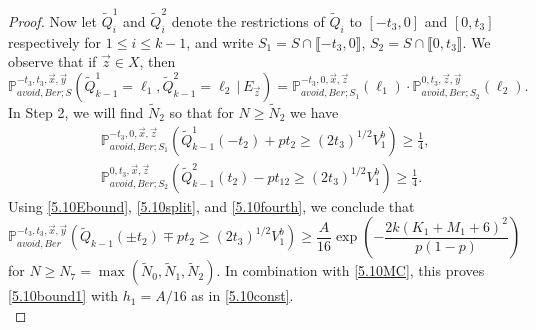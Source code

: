 \begin{proof}
	Now let $\tilde{Q}_i^1$ and $\tilde{Q}_i^2$ denote the restrictions of $\tilde{Q}_i$ to $[-t_3,0]$ and $[0,t_3]$ respectively for $1\leq i\leq k-1$, and write $S_1 = S\cap\llbracket -t_3,0\rrbracket$, $S_2 = S\cap\llbracket 0, t_3\rrbracket$. We observe that if $\vec{z}\in X$, then
	\begin{equation}\label{5.10split}
	\mathbb{P}^{-t_3,t_3,\vec{x},\vec{y}}_{avoid,Ber;S}\left(\tilde{Q}^1_{k-1} = \ell_1, \tilde{Q}^2_{k-1} = \ell_2 \, |\, E_{\vec{z}}\right) = \mathbb{P}^{-t_3,0,\vec{x},\vec{z}}_{avoid,Ber;S_1}(\ell_1)\cdot\mathbb{P}^{0,t_3,\vec{z},\vec{y}}_{avoid,Ber;S_2}(\ell_2).
	\end{equation}
	In Step 2, we will find $\tilde{N}_2$ so that for $N\geq\tilde{N}_2$ we have
	\begin{equation}\label{5.10fourth}
	\begin{split}
	&\mathbb{P}^{-t_3,0,\vec{x},\vec{z}}_{avoid,Ber;S_1}\left(\tilde{Q}^1_{k-1}(-t_2) + pt_2 \geq (2t_3)^{1/2}V_1^b\right) \geq \frac{1}{4},\\
	&\mathbb{P}^{0,t_3,\vec{x},\vec{z}}_{avoid,Ber;S_2}\left(\tilde{Q}^2_{k-1}(t_2) - pt_{12} \geq (2t_3)^{1/2}V_1^b\right) \geq \frac{1}{4}.
	\end{split}
	\end{equation}
	Using \eqref{5.10Ebound}, \eqref{5.10split}, and \eqref{5.10fourth}, we conclude that
	\[
	\mathbb{P}^{-t_3,t_3,\vec{x},\vec{y}}_{avoid, Ber}\left(\tilde{Q}_{k-1}(\pm t_2) \mp pt_2 \geq (2t_3)^{1/2}V_1^b\right) \geq \frac{A}{16}\exp\left(-\frac{2k(K_1+M_1+6)^2}{p(1-p)}\right)
	\]
	for $N\geq N_7 = \max(\tilde{N}_0,\tilde{N}_1,\tilde{N}_2)$. In combination with \eqref{5.10MC}, this proves \eqref{5.10bound1} with $h_1 = A/16$ as in \eqref{5.10const}.\\
	

\end{proof}

